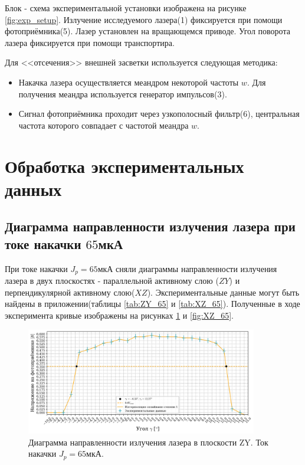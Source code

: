 \documentclass[a4paper, 12pt]{extarticle}
\begin{document}
Блок - схема экспериментальной установки изображена на рисунке \ref{fig:exp_setup}. Излучение исследуемого лазера(1) фиксируется при помощи фотоприёмника(5). Лазер установлен на вращающемся приводе. Угол поворота лазера фиксируется при помощи транспортира. 

Для <<отсечения>> внешней засветки используется следующая методика:
    \begin{itemize}
        \item Накачка лазера осуществляется меандром некоторой частоты $w$. Для получения меандра используется генератор импульсов(3).
        \item Сигнал фотоприёмника проходит через узкополосный фильтр(6), центральная частота которого совпадает с частотой меандра $w$. 
    \end{itemize}

\section*{\textcolor{header}{Обработка экспериментальных данных}}
\subsection*{\textcolor{sub_header}{Диаграмма направленности излучения лазера при токе накачки $65$мкА}}


При токе накачки $J_p = 65 \text{мкА}$ сняли диаграммы направленности излучения лазера в двух плоскостях - параллельной активному слою ($ZY$) и перпендикулярной активному слою($XZ$). Экспериментальные данные могут быть найдены в приложении(таблицы \ref{tab:ZY_65} и \ref{tab:XZ_65}). Полученные в ходе эксперимента кривые изображены на рисунках \ref{fig:ZY_65} и \ref{fig:XZ_65}.

\begin{figure}[htbp]
    \centering
    \includegraphics[width = 0.9\textwidth]{pics/lazer_horizonta_65.png}
    \caption{Диаграмма направленности излучения лазера в плоскости ZY. Ток накачки $J_p = 65\text{мкА}$.}
    \label{fig:ZY_65}
\end{figure}
\end{document}
